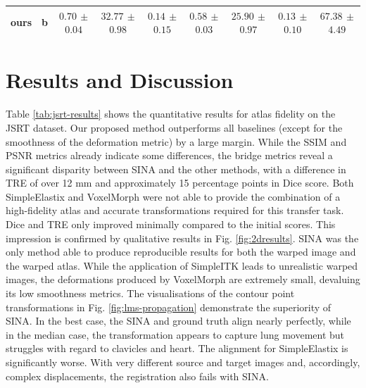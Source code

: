 \begin{table}[t]
{\begin{tabular}{c|c|ccc|ccc|c}
        \cline{3-9}
        ours & b & \makecell{$\mathbf{0.70}$ \\ $\pm$ $\mathbf{0.04}$} & \makecell{$32.77$ \\ $\pm$ $0.98$} & \makecell{$0.14$ \\ $\pm$ $0.15$} & \makecell{$0.58$ \\ $\pm$ $0.03$} & \makecell{$25.90$ \\ $\pm$ $0.97$} & \makecell{$0.13$ \\ $\pm$ $0.10$} &\makecell{$67.38$ \\ $\pm$ $4.49$}\\
        \bottomrule
    \end{tabular}%
    }
    
\end{table}





\section{Results and Discussion}

Table \ref{tab:jsrt-results} shows the quantitative results for atlas fidelity on the JSRT dataset. Our proposed method outperforms all baselines (except for the smoothness of the deformation metric) by a large margin. While the SSIM and PSNR metrics already indicate some differences, the bridge metrics reveal a significant disparity between SINA and the other methods, with a difference in TRE of over 12 mm and approximately 15 percentage points in Dice score. Both SimpleElastix and VoxelMorph were not able to provide the combination of a high-fidelity atlas and accurate transformations required for this transfer task.  Dice and TRE only improved minimally compared to the initial scores.  This impression is confirmed by qualitative results in Fig. \ref{fig:2dresults}.   SINA was the only method able to produce reproducible results for both the warped image and the warped atlas. While the application of SimpleITK leads to unrealistic warped images, the deformations produced by VoxelMorph are extremely small, devaluing its low smoothness metrics.  The visualisations of the contour point transformations in Fig. \ref{fig:lms-propagation} demonstrate the superiority of SINA. In the best case, the SINA and ground truth align nearly perfectly, while in the median case, the transformation appears to capture lung movement but struggles with regard to clavicles and heart. The alignment for SimpleElastix is significantly worse. With very different source and target images and, accordingly, complex displacements, the registration also fails with SINA. 

